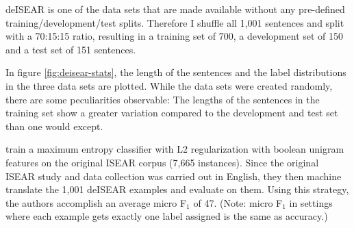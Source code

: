 

deISEAR is one of the data sets that are made available without any pre-defined
training/development/test splits. Therefore I shuffle all 1,001 sentences and
split with a 70:15:15 ratio, resulting in a training set of 700, a development
set of 150 and a test set of 151 sentences.

In figure \ref{fig:deisear-stats}, the length of the sentences and the label distributions in the three data sets are
plotted. While the data sets were created randomly, there are some peculiarities observable: The lengths of the sentences
in the training set show a greater variation compared to the development and test set than one would except.







\cite{troiano2019crowdsourcing} train a maximum entropy classifier with L2 regularization with
boolean unigram features on the original ISEAR corpus (7,665 instances).
Since the original ISEAR study and data collection was carried out in English, they then machine
translate the 1,001 deISEAR examples and evaluate on them.
Using this strategy, the authors accomplish an average micro F$_1$ of 47. (Note: micro F$_1$ in settings where each example gets
exactly one label assigned is the same as accuracy.)

